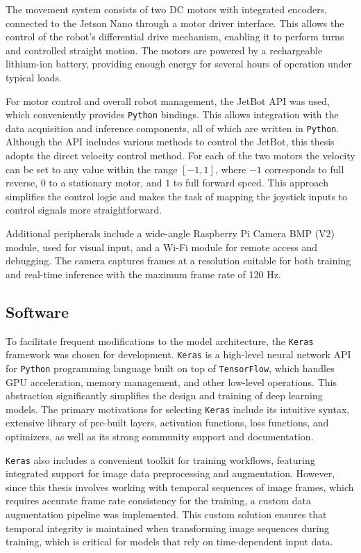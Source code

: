 The movement system consists of two DC motors with integrated encoders, connected to the Jetson Nano through a motor driver interface. This allows the control of the robot’s differential drive mechanism, enabling it to perform turns and controlled straight motion. The motors are powered by a rechargeable lithium-ion battery, providing enough energy for several hours of operation under typical loads.

For motor control and overall robot management, the JetBot API was used, which conveniently provides \texttt{Python} bindings. This allows integration with the data acquisition and inference components, all of which are written in \texttt{Python}. Although the API includes various methods to control the JetBot, this thesis adopts the direct velocity control method. For each of the two motors the velocity can be set to any value within the range \([-1, 1]\), where \(-1\) corresponds to full reverse, \(0\) to a stationary motor, and \(1\) to full forward speed. This approach simplifies the control logic and makes the task of mapping the joystick inputs to control signals more straightforward.

Additional peripherals include a wide-angle Raspberry Pi Camera BMP (V2) module, used for visual input, and a Wi-Fi module for remote access and debugging. The camera captures frames at a resolution suitable for both training and real-time inference with the maximum frame rate of 120 Hz.

\subsection{Software}

To facilitate frequent modifications to the model architecture, the \texttt{Keras} framework was chosen for development. \texttt{Keras} is a high-level neural network API for \texttt{Python} programming language built on top of \texttt{TensorFlow}, which handles GPU acceleration, memory management, and other low-level operations. This abstraction significantly simplifies the design and training of deep learning models. The primary motivations for selecting \texttt{Keras} include its intuitive syntax, extensive library of pre-built layers, activation functions, loss functions, and optimizers, as well as its strong community support and documentation.

\texttt{Keras} also includes a convenient toolkit for training workflows, featuring integrated support for image data preprocessing and augmentation. However, since this thesis involves working with temporal sequences of image frames, which requires accurate frame rate consistency for the training, a custom data augmentation pipeline was implemented. This custom solution ensures that temporal integrity is maintained when transforming image sequences during training, which is critical for models that rely on time-dependent input data.

